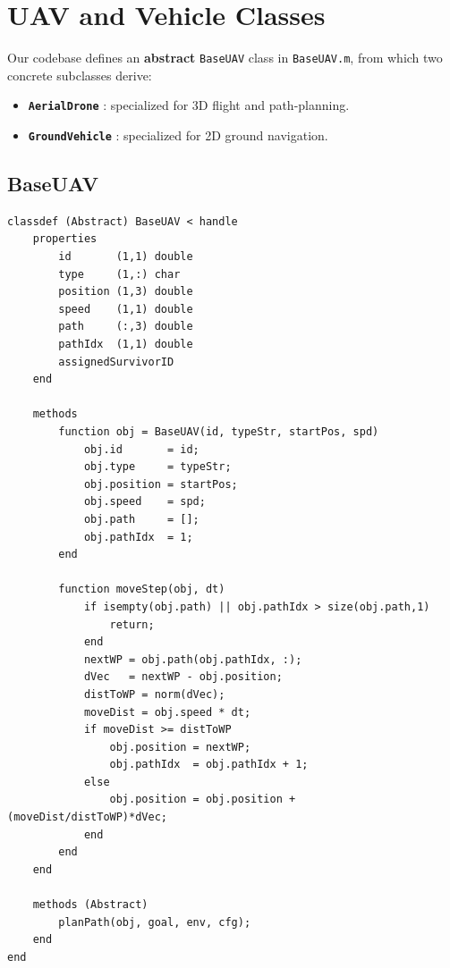 \documentclass[12pt,a4paper]{report}
\begin{document}
\section{UAV and Vehicle Classes}
\label{sec:uav_classes}

Our codebase defines an \textbf{abstract} \texttt{BaseUAV} class in \texttt{BaseUAV.m}, 
from which two concrete subclasses derive:
\begin{itemize}
    \item \textbf{\texttt{AerialDrone}} : specialized for 3D flight and path-planning.
    \item \textbf{\texttt{GroundVehicle}} : specialized for 2D ground navigation.
\end{itemize}

\subsection{BaseUAV}
\label{sec:baseuav_code}

\begin{verbatim}
classdef (Abstract) BaseUAV < handle
    properties
        id       (1,1) double
        type     (1,:) char
        position (1,3) double
        speed    (1,1) double
        path     (:,3) double
        pathIdx  (1,1) double
        assignedSurvivorID
    end

    methods
        function obj = BaseUAV(id, typeStr, startPos, spd)
            obj.id       = id;
            obj.type     = typeStr;
            obj.position = startPos;
            obj.speed    = spd;
            obj.path     = [];
            obj.pathIdx  = 1;
        end

        function moveStep(obj, dt)
            if isempty(obj.path) || obj.pathIdx > size(obj.path,1)
                return;
            end
            nextWP = obj.path(obj.pathIdx, :);
            dVec   = nextWP - obj.position;
            distToWP = norm(dVec);
            moveDist = obj.speed * dt;
            if moveDist >= distToWP
                obj.position = nextWP;
                obj.pathIdx  = obj.pathIdx + 1;
            else
                obj.position = obj.position + (moveDist/distToWP)*dVec;
            end
        end
    end

    methods (Abstract)
        planPath(obj, goal, env, cfg);
    end
end
\end{verbatim}
\end{document}

